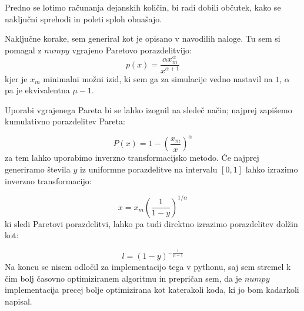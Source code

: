 \documentclass[slovene,11pt,a4paper]{article}
\begin{document}
Predno se lotimo računanja dejanskih količin, bi radi dobili občutek, kako se naključni sprehodi in poleti sploh obnašajo. 

Naključne korake, sem generiral kot je opisano v navodilih naloge. Tu sem si pomagal z $numpy$ vgrajeno Paretovo porazdelitvijo: 
$$
  p(x) = \frac{\alpha x_m^\alpha}{x^{\alpha + 1}}
$$
kjer je $x_m$ minimalni možni izid, ki sem ga za simulacije vedno nastavil na $1$, $\alpha$ pa je ekvivalentna $\mu - 1$.

Uporabi vgrajenega Pareta bi se lahko izognil na sledeč način; najprej zapišemo kumulativno porazdelitev Pareta:

$$
  P(x) = 1 - \left(\frac{x_m}{x}\right)^\alpha
$$
za tem lahko uporabimo inverzno transformacijsko metodo. Če najprej generiramo števila $y$ iz uniformne porazdelitve na intervalu $\left[0, 1\right]$ lahko izrazimo inverzno transformacijo:

$$
  x = x_m\left(\frac{1}{1 - y}\right)^{1/\alpha}
$$
ki sledi Paretovi porazdelitvi, lahko pa tudi direktno izrazimo porazdelitev dolžin kot:

$$
  l = (1 - y)^{-\frac{1}{\mu - 1}}
$$
Na koncu se nisem odločil za implementacijo tega v pythonu, saj sem stremel k čim bolj časovno optimiziranem algoritmu in prepričan sem, da je $numpy$ implementacija precej bolje optimizirana kot katerakoli koda, ki jo bom kadarkoli napisal.

\newpage


\end{document}
